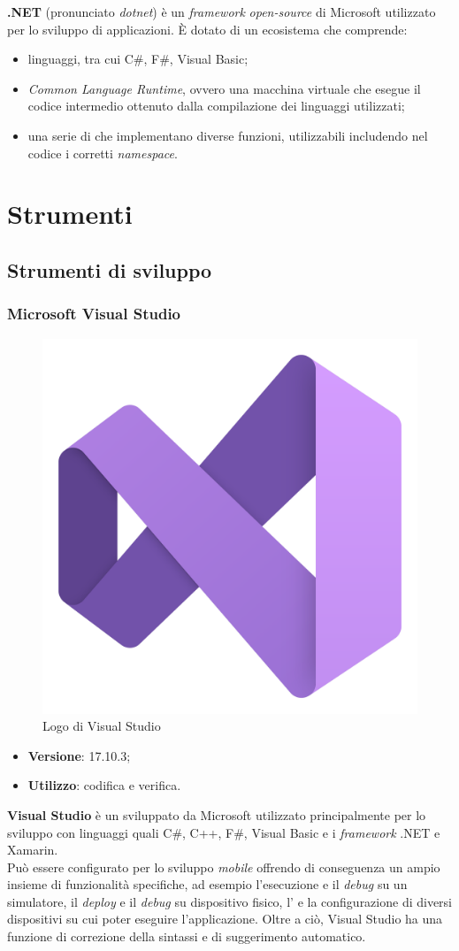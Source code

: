\noindent \textbf{.NET} (pronunciato \textit{dotnet}) è un \textit{framework} \textit{open-source} di Microsoft utilizzato per lo sviluppo di applicazioni. È dotato di un ecosistema che comprende:
\begin{itemize}
    \item linguaggi, tra cui C\#, F\#, Visual Basic;
    \item \textit{Common Language Runtime}, ovvero una macchina virtuale che esegue il codice intermedio ottenuto dalla compilazione dei linguaggi utilizzati;
    \item una serie di  che implementano diverse funzioni, utilizzabili includendo nel codice i corretti \textit{namespace}.
\end{itemize}

\section{Strumenti}

\subsection{Strumenti di sviluppo}

\subsubsection{Microsoft Visual Studio}

\begin{figure}[H]
    \centering 
    \includegraphics[width=0.2\columnwidth]{images/loghi/Visual_Studio.png} 
    \caption{Logo di Visual Studio}
\end{figure}

\begin{itemize}
    \item \textbf{Versione}: 17.10.3;
    \item \textbf{Utilizzo}: codifica e verifica.
\end{itemize}

\noindent \textbf{Visual Studio} è un  sviluppato da Microsoft utilizzato principalmente per lo sviluppo con linguaggi quali C\#, C++, F\#, Visual Basic e i \textit{framework} .NET e Xamarin.\\
Può essere configurato per lo sviluppo \textit{mobile} offrendo di conseguenza un ampio insieme di funzionalità specifiche, ad esempio l'esecuzione e il \textit{debug} su un simulatore, il \textit{deploy} e il \textit{debug} su dispositivo fisico, l'\textit{} e la configurazione di diversi dispositivi su cui poter eseguire l'applicazione. Oltre a ciò, Visual Studio ha una funzione di correzione della sintassi e di suggerimento automatico.

